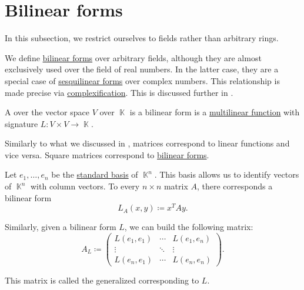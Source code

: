 \section{Bilinear forms}\label{sec:bilinear_forms}

In this subsection, we restrict ourselves to fields rather than arbitrary rings.

We define \hyperref[def:bilinear_form]{bilinear forms} over arbitrary fields, although they are almost exclusively used over the field of real numbers. In the latter case, they are a special case of \hyperref[def:sesquilinear_form]{sesquilinear forms} over complex numbers. This relationship is made precise via \hyperref[def:complexification]{complexification}. This is discussed further in .

\begin{definition}\label{def:bilinear_form}
  A  over the vector space \( V \) over \( \BbbK \) is a bilinear form is a \hyperref[def:multilinear_function]{multilinear function} with signature \( L: V \times V \to \BbbK \).
\end{definition}

\begin{remark}\label{rem:matrices_as_bilinear_forms}
  Similarly to what we discussed in , matrices correspond to linear functions and vice versa. Square matrices correspond to \hyperref[def:bilinear_form]{bilinear forms}.

  Let \( e_1, \ldots, e_n \) be the \hyperref[def:sequence_space]{standard basis} of \( \BbbK^n \). This basis allows us to identify vectors of \( \BbbK^n \) with column vectors. To every \( n \times n \) matrix \( A \), there corresponds a bilinear form
  \begin{equation*}
    L_A(x, y) \coloneqq x^T A y.
  \end{equation*}

  Similarly, given a bilinear form \( L \), we can build the following matrix:
  \begin{equation*}
    A_L \coloneqq
    \begin{pmatrix}
      L(e_1, e_1) & \cdots & L(e_1, e_n) \\
      \vdots      & \ddots & \vdots      \\
      L(e_n, e_1) & \cdots & L(e_n, e_n)
    \end{pmatrix}.
  \end{equation*}

  This matrix is called the generalized  corresponding to \( L \).
\end{remark}

